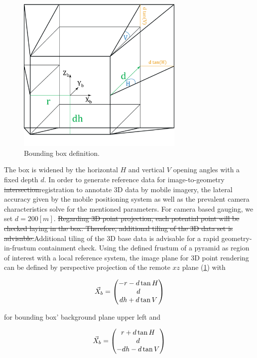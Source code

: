 \documentclass[review]{elsarticle}
\begin{document}
\begin{figure}[h]
\centering
\includegraphics[width=8cm]{graphics/4_3_Bounding_Box}
\caption{Bounding box definition.}
\label{fig:4_3_bounding_box}
\end{figure}

The box is widened by the horizontal $H$ and vertical $V$ opening angles with a fixed depth $d$. In order to generate reference data for image-to-geometry \sout{intersection}registration to annotate 3D data by mobile imagery, the lateral accuracy given by the mobile positioning system as well as the prevalent camera characteristics solve for the mentioned parameters. For camera based gauging, we set $d = 200 [m]$. \sout{Regarding 3D point projection, each potential point will be checked laying in the box. Therefore, additional tiling of the 3D data set is advisable.}Additional tiling of the 3D base data is advisable for a rapid geometry-in-frustum containment check.
Using the defined frustum of a pyramid as region of interest with a local reference system, the image plane for 3D point rendering can be defined by perspective projection of the remote $xz$ plane (\ref{fig:4_3_bounding_box}) with 

\begin{equation}
\vec{X}_b = \begin{pmatrix}
-r - d \tan H \\
d \\
dh + d \tan V
\end{pmatrix}
\notag
\end{equation} 

for bounding box' background plane upper left and 

\begin{equation}
\vec{X}_b =\begin{pmatrix}
r + d \tan H\\
d\\
-dh - d \tan V
\end{pmatrix}
\notag
\end{equation} 
\end{document}
